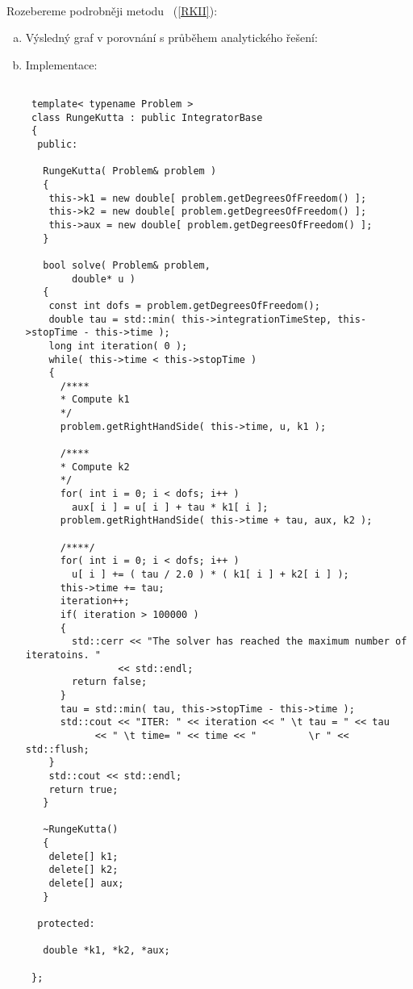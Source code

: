 \documentclass[11pt,american,czech]{article}
\begin{document}
\hrulefill
\vspace{0.1cm} \\

Rozebereme podrobněji metodu ~(\ref{RKII}):
\begin{enumerate}[(a)]
	\item Výsledný graf v porovnání s průběhem analytického řešení:
		\begin{figure}
		
		\end{figure}
	\item Implementace:
		\begin{lstlisting}
		 
 template< typename Problem >
 class RungeKutta : public IntegratorBase
 {
  public:

   RungeKutta( Problem& problem )
   {
	this->k1 = new double[ problem.getDegreesOfFreedom() ];
	this->k2 = new double[ problem.getDegreesOfFreedom() ];
	this->aux = new double[ problem.getDegreesOfFreedom() ];
   }

   bool solve( Problem& problem,
		double* u )
   {
	const int dofs = problem.getDegreesOfFreedom();
	double tau = std::min( this->integrationTimeStep, this->stopTime - this->time );
	long int iteration( 0 );
	while( this->time < this->stopTime )
	{
	  /****
	  * Compute k1
	  */
	  problem.getRightHandSide( this->time, u, k1 );

	  /****
	  * Compute k2
	  */
	  for( int i = 0; i < dofs; i++ )
	    aux[ i ] = u[ i ] + tau * k1[ i ];
	  problem.getRightHandSide( this->time + tau, aux, k2 );

	  /****/
	  for( int i = 0; i < dofs; i++ )
	    u[ i ] += ( tau / 2.0 ) * ( k1[ i ] + k2[ i ] );
	  this->time += tau;
	  iteration++;
	  if( iteration > 100000 )
	  {
	    std::cerr << "The solver has reached the maximum number of iteratoins. " 
	    		<< std::endl;
	    return false;
	  }
	  tau = std::min( tau, this->stopTime - this->time );
	  std::cout << "ITER: " << iteration << " \t tau = " << tau 
	  		<< " \t time= " << time << "         \r " << std::flush;  
	}
	std::cout << std::endl;
	return true;
   }

   ~RungeKutta()
   {
	delete[] k1;
	delete[] k2;
	delete[] aux;
   }

  protected:

   double *k1, *k2, *aux;

 };
		\end{lstlisting}

\end{enumerate}
\end{document}
